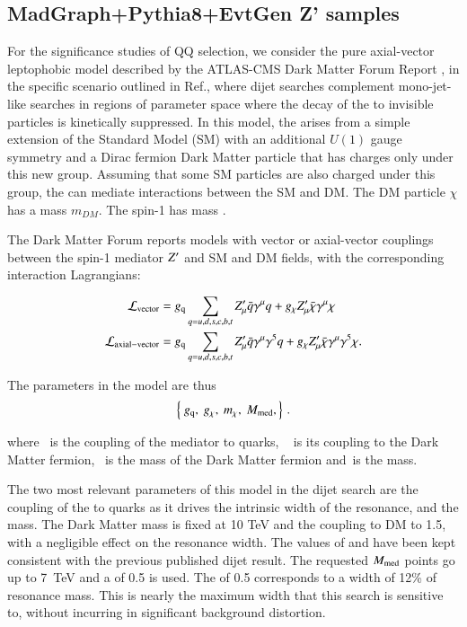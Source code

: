 \subsection{MadGraph+Pythia8+EvtGen Z' samples}
\label{subsec:MCZprimeSamples}

For the significance studies of QQ selection, we consider the pure axial-vector
leptophobic \Zprime model described by the ATLAS-CMS Dark Matter Forum
Report \cite{Abercrombie:2015wmb}, in the specific scenario outlined in Ref.\cite{Chala:2015ama},
where dijet searches complement mono-jet-like searches in regions of
parameter space where the decay of the \Zprime to invisible particles is
kinetically suppressed.
%
In this model, the \Zprime arises from a simple extension of the Standard
Model (SM) with an additional $U(1)$ gauge symmetry and a Dirac
fermion Dark Matter particle that has charges only under this new
group. Assuming that some SM particles are also charged under this
group, the \Zprime can mediate interactions between the SM and DM. The DM
particle $\chi$ has a mass $m_{DM}$. The spin-1 \Zprime has mass \mMed.

The Dark Matter Forum reports models with vector or axial-vector couplings
between the spin-1 mediator $Z^\prime$ and SM and DM fields, with the corresponding interaction Lagrangians:

\begin{align}
	\mathcal{L}_{\mathrm{vector}} &= g_{\mathrm q} \sum_{q={u,d,s,c,b,t}}  Z^\prime_{\mu} \bar{q}\gamma^{\mu}q + g_{\chi} Z^\prime_{\mu} \bar{\chi}\gamma^{\mu}\chi \\
	\mathcal{L}_{\mathrm{axial-vector}} &= g_{\mathrm q} \sum_{q={u,d,s,c,b,t}}  Z^\prime_{\mu} \bar{q}\gamma^{\mu}\gamma^5q + g_{\chi} Z^\prime_{\mu} \bar{\chi}\gamma^{\mu}\gamma^5\chi.
\end{align}

The parameters in the model are thus
\begin{equation}
\left\{~g_{\mathrm q},
~ g_{\chi},
~m_{\chi},
~M_{\mathrm{med}},
\right\} \,.
\end{equation}

where ~\gq is the coupling of the \Zprime mediator to quarks, ~ \gDM
is its coupling to the Dark Matter fermion, ~\mDM is the mass
of the Dark Matter fermion and~\mMed is the \Zprime mass.

The two most relevant parameters of this model in the dijet search are the coupling of the \Zprime to quarks
as it drives the intrinsic width of the resonance, and the \Zprime mass. The Dark Matter mass is fixed at 10 TeV and the coupling to DM to 1.5, with
a negligible effect on the resonance width.
%
The values of \gq and \mMed have been kept consistent with the previous published dijet result.
The requested $M_{\mathrm{med}}$ points go up to 7~TeV and a \gq of 0.5 is used. The \gq of 0.5 corresponds to a width of 12\% of resonance mass. 
This is nearly the maximum width
that this search is sensitive to, without incurring in significant background distortion.

